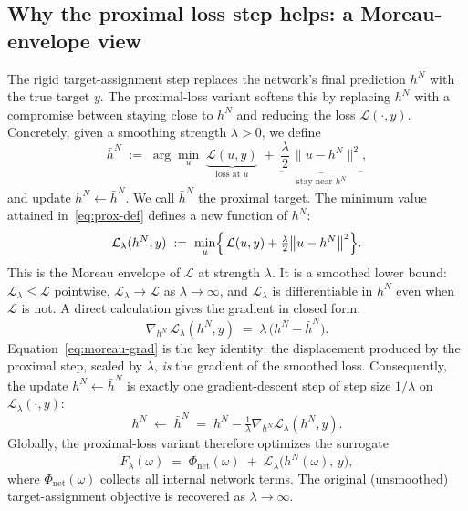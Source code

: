 \documentclass{article}
\begin{document}
\subsection{Why the proximal loss step helps: a Moreau-envelope view}
\label{sec:moreau}
 
The rigid target-assignment step replaces the network's final prediction
$h^{N}$ with the true target $y$. The proximal-loss variant softens this
by replacing $h^{N}$ with a compromise between staying close to $h^{N}$
and reducing the loss $\mathcal{L}(\cdot,y)$. Concretely, given a
smoothing strength $\lambda>0$, we define
\begin{equation}
\bar h^{N} \;:=\; \arg\min_{u}\;
\underbrace{\mathcal{L}(u,y)}_{\text{loss at }u}
\;+\;
\underbrace{\frac{\lambda}{2}\,\bigl\|u-h^{N}\bigr\|^{2}}_{\text{stay near }h^{N}} ,
\label{eq:prox-def}
\end{equation}
and update $h^{N}\leftarrow\bar h^{N}$. We call $\bar h^{N}$ the
proximal target.
The minimum value attained in~\eqref{eq:prox-def} defines a new function
of $h^{N}$:
\begin{equation}
\mathcal{L}_{\lambda}(h^{N},y)
\;:=\;
\min_{u}\Bigl\{\,\mathcal{L}(u,y)+\tfrac{\lambda}{2}\bigl\|u-h^{N}\bigr\|^{2}\Bigr\}.
\label{eq:env-def}
\end{equation}
This is the Moreau envelope of $\mathcal{L}$ at strength $\lambda$.
It is a smoothed lower bound: $\mathcal{L}_{\lambda}\le\mathcal{L}$ pointwise,
$\mathcal{L}_{\lambda}\to\mathcal{L}$ as $\lambda\to\infty$, and
$\mathcal{L}_{\lambda}$ is differentiable in $h^{N}$ even when
$\mathcal{L}$ is not. A direct calculation gives the gradient in closed form:
\begin{equation}
\nabla_{\!h^{N}}\,\mathcal{L}_{\lambda}(h^{N},y)
\;=\;
\lambda\,\bigl(h^{N}-\bar h^{N}\bigr).
\label{eq:moreau-grad}
\end{equation}
Equation~\eqref{eq:moreau-grad} is the key identity: the displacement
produced by the proximal step, scaled by $\lambda$, \emph{is} the gradient
of the smoothed loss. Consequently, the update $h^{N}\leftarrow\bar h^{N}$
is exactly one gradient-descent step of step size $1/\lambda$ on
$\mathcal{L}_{\lambda}(\cdot,y)$:
\[
h^{N}\;\leftarrow\;\bar h^{N}
\;=\;h^{N}-\tfrac{1}{\lambda}\nabla_{\!h^{N}}\mathcal{L}_{\lambda}(h^{N},y).
\]
 Globally, the proximal-loss variant therefore optimizes the surrogate
\begin{equation}
\widetilde{F}_{\lambda}(\omega)
\;=\;
\Phi_{\mathrm{net}}(\omega)\;+\;\mathcal{L}_{\lambda}\!\bigl(h^{N}(\omega),\,y\bigr),
\end{equation}
where $\Phi_{\mathrm{net}}(\omega)$ collects all internal network terms.
The original (unsmoothed) target-assignment objective is recovered as
$\lambda\to \infty$.
\end{document}
